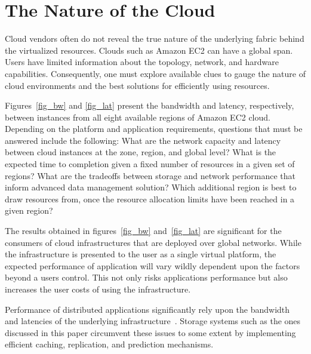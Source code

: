 \documentclass{sig-alternate}
\begin{document}
\section{The Nature of the Cloud}\label{sec:understanding}
Cloud vendors often do not reveal the true nature of the underlying fabric
behind the virtualized resources. Clouds such as Amazon EC2 can have a global
span. Users have limited information about the topology, network, and hardware
capabilities. Consequently, one must explore available clues to gauge the
nature of cloud environments and the best solutions for efficiently using
resources. 

Figures~\ref{fig_bw} and \ref{fig_lat} present the bandwidth and latency,
respectively, between instances from all eight available regions of Amazon EC2
cloud. Depending on the platform and application requirements, questions that
must be answered include the following: What are the network capacity and
latency between cloud instances at the zone, region, and global level? What is
the expected time to completion given a fixed number of resources in a given
set of regions? What are the tradeoffs between storage and network performance
that inform advanced data management solution?  Which additional region is best
to draw resources from, once the resource allocation limits have been reached
in a given region?

The results obtained in figures~\ref{fig_bw} and~\ref{fig_lat} are significant
for the consumers of cloud infrastructures that are deployed over global
networks. While the infrastructure is presented to the user as a single virtual
platform, the expected performance of application will vary wildly dependent
upon the factors beyond a users control. This not only risks applications
performance but also increases the user costs of using the infrastructure.

Performance of distributed applications significantly rely upon the bandwidth
and latencies of the underlying infrastructure~\cite{latency}. Storage systems
such as the ones discussed in this paper circumvent these issues to some extent
by implementing efficient caching, replication, and prediction mechanisms.
\end{document}
